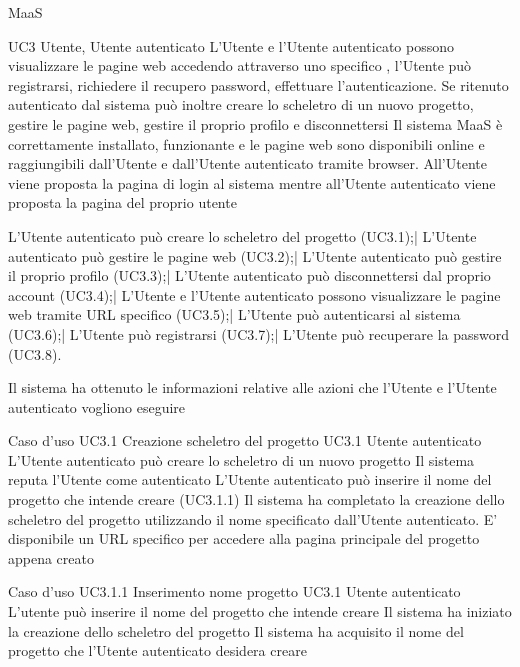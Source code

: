 
{MaaS}

\UC
{UC3}
{Utente, Utente autenticato}
{L'Utente e l'Utente autenticato possono visualizzare le pagine web accedendo attraverso uno specifico , l'Utente può registrarsi, richiedere il recupero password, effettuare l'autenticazione. Se ritenuto autenticato dal sistema può inoltre creare lo scheletro di un nuovo progetto, gestire le pagine web, gestire il proprio profilo e disconnettersi}
{Il sistema MaaS è correttamente installato, funzionante e le pagine web sono disponibili online e raggiungibili dall'Utente e dall'Utente autenticato tramite browser. All'Utente viene proposta la pagina di login al sistema mentre all'Utente autenticato viene proposta la pagina del proprio  utente}

\scenario
{L'Utente autenticato può creare lo scheletro del progetto (UC3.1);|
L'Utente autenticato può  gestire le pagine web (UC3.2);|
L'Utente autenticato può  gestire il proprio profilo (UC3.3);|
L'Utente autenticato può  disconnettersi dal proprio account (UC3.4);|
L'Utente e l'Utente autenticato possono visualizzare le pagine web tramite URL specifico (UC3.5);|
L'Utente può autenticarsi al sistema (UC3.6);|
L'Utente può registrarsi (UC3.7);|
L'Utente può recuperare la password (UC3.8).
}

\post
{Il sistema ha ottenuto le informazioni relative alle azioni che l'Utente e l'Utente autenticato vogliono eseguire}


\UCtitle
{Caso d'uso UC3.1}
{Creazione scheletro del progetto}
\UC
{UC3.1}
{Utente autenticato}
{L'Utente autenticato può creare lo scheletro di un nuovo progetto}
{Il sistema reputa l'Utente come autenticato}
\scenario
{L'Utente autenticato può inserire il nome del progetto che intende creare (UC3.1.1)}
\post
{Il sistema ha completato la creazione dello scheletro del progetto utilizzando il nome specificato dall'Utente autenticato. E' disponibile un URL specifico per accedere alla pagina principale del progetto appena creato}

\UCtitle
{Caso d'uso UC3.1.1}
{Inserimento nome progetto}
\UC
{UC3.1}
{Utente autenticato}
{L'utente può inserire il nome del progetto che intende creare}
{Il sistema ha iniziato la creazione dello scheletro del progetto}
\post
{Il sistema ha acquisito il nome del progetto che l'Utente autenticato desidera creare}

